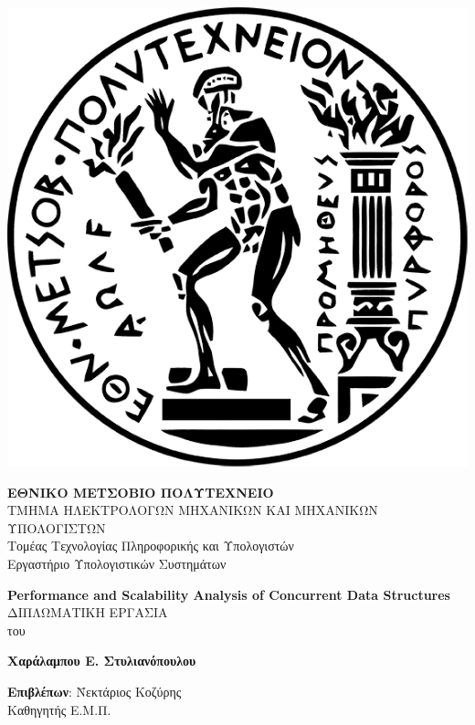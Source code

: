 \documentclass[12pt, twoside, a4paper]{report}
\begin{document}
\maketitle
\hspace{10pt}
\includegraphics[scale=0.14]{pyrforos.png}  %
\noindent
\parbox[b]{0.6\textwidth} {
\raggedright \textbf{\normalsize{Ε}\small{ΘΝΙΚΟ} 
\normalsize{Μ}\small{ΕΤΣΟΒΙΟ}
\normalsize{Π}\small{ΟΛΥΤΕΧΝΕΙΟ}} \\
\small
ΤΜΗΜΑ ΗΛΕΚΤΡΟΛΟΓΩΝ ΜΗΧΑΝΙΚΩΝ ΚΑΙ ΜΗΧΑΝΙΚΩΝ ΥΠΟΛΟΓΙΣΤΩΝ \\
Τομέας Τεχνολογίας Πληροφορικής και Υπολογιστών \\
Εργαστήριο Υπολογιστικών Συστημάτων}

\begin{center}
\vspace{8ex}
\large \textbf{\textlatin{Performance and Scalability Analysis of Concurrent Data Structures}} \\
\vspace{10ex}
\large
ΔΙΠΛΩΜΑΤΙΚΗ ΕΡΓΑΣΙΑ \\
\vspace{2ex}
\normalsize
του \\
\vspace{2ex}
\hspace{-0.2cm}
\parbox[c]{\textwidth} { \center\textbf{
Χαράλαμπου Ε. Στυλιανόπουλου} }
\vspace{10ex}
\flushleft
\begin{tabbing}
\textbf{Επιβλέπων}: \= Νεκτάριος Κοζύρης \\
		    \> Καθηγητής Ε.Μ.Π. \\
\end{tabbing}
\end{center}
\end{document}
